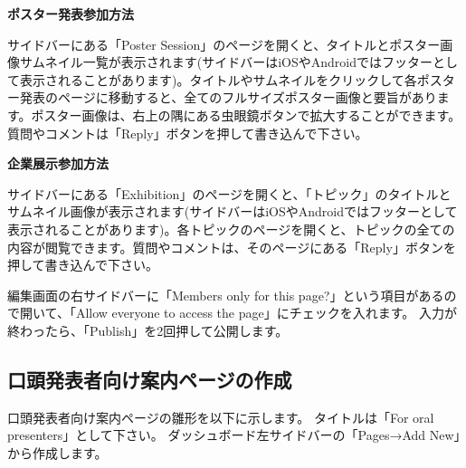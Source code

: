 \documentclass[titlepage,10pt,a4paper,uplatex]{jsbook}
\newenvironment{content}{\begin{shaded}\vspace{-1em}\raggedright\ttfamily\footnotesize\setlength{\baselineskip}{1.4em}}{\end{shaded}\vspace{-1em}}
\renewcommand{\textbf}[1]{{\bfseries\sffamily#1}}
\begin{document}
\begin{content}
\textbf{\Large ポスター発表参加方法}

サイドバーにある「Poster Session」のページを開くと、タイトルとポスター画像サムネイル一覧が表示されます(サイドバーはiOSやAndroidではフッターとして表示されることがあります)。タイトルやサムネイルをクリックして各ポスター発表のページに移動すると、全てのフルサイズポスター画像と要旨があります。ポスター画像は、右上の隅にある虫眼鏡ボタンで拡大することができます。質問やコメントは「Reply」ボタンを押して書き込んで下さい。

\textbf{\Large 企業展示参加方法}

サイドバーにある「Exhibition」のページを開くと、「トピック」のタイトルとサムネイル画像が表示されます(サイドバーはiOSやAndroidではフッターとして表示されることがあります)。各トピックのページを開くと、トピックの全ての内容が閲覧できます。質問やコメントは、そのページにある「Reply」ボタンを押して書き込んで下さい。
\end{content}

編集画面の右サイドバーに「Members only for this page?」という項目があるので開いて、「Allow everyone to access the page」にチェックを入れます。
入力が終わったら、「Publish」を2回押して公開します。

\subsection{口頭発表者向け案内ページの作成}

口頭発表者向け案内ページの雛形を以下に示します。
タイトルは「For oral presenters」として下さい。
ダッシュボード左サイドバーの「Pages→Add New」から作成します。
\end{document}

